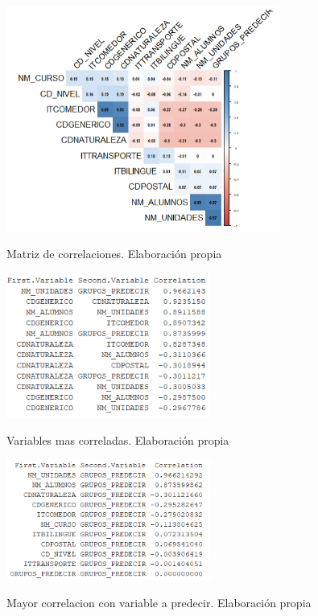 	\begin{figure}[htb]
	\centering
	\caption{Matriz de correlaciones. Elaboración propia}
	\includegraphics[width=0.8\textwidth]{recursos/ImagenesR/matrizcorrelacion}
	\label{fig:matrizcorrelaciones}
\end{figure}
\FloatBarrier


	\begin{figure}[htb]
	\centering
	\caption{Variables mas correladas. Elaboración propia}
	\includegraphics[width=0.6\textwidth]{recursos/ImagenesR/mayorescorrelaciones}
	\label{fig:mayorescorrelaciones}
\end{figure}
\FloatBarrier

	\begin{figure}[htb]
	\centering
	\caption{Mayor correlacion con variable a predecir. Elaboración propia}
	\includegraphics[width=0.6\textwidth]{recursos/ImagenesR/mayorcorrelacion}
	\label{fig:mayorcorrelacionpredecir}
\end{figure}
\FloatBarrier

